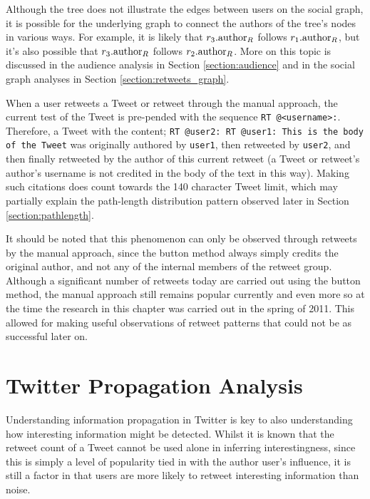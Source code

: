 Although the tree does not illustrate the edges between users on the social graph, it is possible for the underlying graph to connect the authors of the tree's nodes in various ways. For example, it is likely that $r_3.\textrm{author}_R$ follows $r_1.\textrm{author}_R$, but it's also possible that $r_3.\textrm{author}_R$ follows $r_2.\textrm{author}_R$. More on this topic is discussed in the audience analysis in Section \ref{section:audience} and in the social graph analyses in Section  \ref{section:retweets_graph}.

When a user retweets a Tweet or retweet through the manual approach, the current test of the Tweet is pre-pended with the sequence \texttt{RT @<username>:}. Therefore, a Tweet with the content;\newline
\texttt{RT @user2: RT @user1: This is the body of the Tweet}\newline
was originally authored by \texttt{user1}, then retweeted by \texttt{user2}, and then finally retweeted by the author of this current retweet (a Tweet or retweet's author's username is not credited in the body of the text in this way). Making such citations does count towards the 140 character Tweet limit, which may partially explain the path-length distribution pattern observed later in Section \ref{section:pathlength}.

It should be noted that this phenomenon can only be observed through retweets by the manual approach, since the button method always simply credits the original author, and not any of the internal members of the retweet group. Although a significant number of retweets today are carried out using the button method, the manual approach still remains popular currently and even more so at the time the research in this chapter was carried out in the spring of 2011. This allowed for making useful observations of retweet patterns that could not be as successful later on.


\section{Twitter Propagation Analysis}
Understanding information propagation in Twitter is key to also understanding how interesting information might be detected. Whilst it is known that the retweet count of a Tweet cannot be used alone in inferring interestingness, since this is simply a level of popularity tied in with the author user's influence, it is still a factor in that users are more likely to retweet interesting information than noise.

